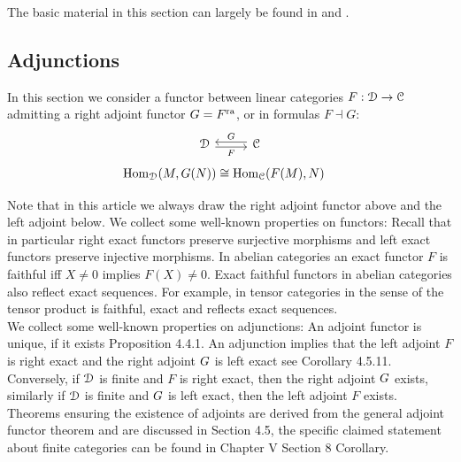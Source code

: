 \documentclass[a4paper, reqno]{amsart}
\theoremstyle{introTheorems}
\newcommand\Hom{\textup{Hom}}
\renewcommand{\1}{\mathbbold{1}}
\begin{document}
The basic material in this section can largely be found in \cite{Riehl16} and \cite{BV07}. 

\subsection{Adjunctions}

In this section we consider  a functor between linear categories $F:\mathcal{D} \to \mathcal{C}$ admitting a right adjoint functor ${G}=F^{\mathrm{ra}}$, or in formulas $F\dashv G$:
\[\begin{tikzcd}[row sep=5ex, column sep=6ex]
\catD\arrow[r,swap, shift right=2pt,"F"] & \arrow[l,swap, shift right=2pt,"\Fra"] \catC
\end{tikzcd}\]
\begin{align*}
\Hom_\catD(M,\Fra(N)) 
&\cong\Hom_\catC(F(M),N) 
\end{align*}

Note that in this article we always draw the right adjoint functor above and the left adjoint below. We collect some well-known properties on functors: 
Recall that in particular right exact functors preserve surjective morphisms and left exact functors preserve injective morphisms.
In abelian categories an exact functor $F$ is faithful iff $X\neq 0$ implies $F(X)\neq 0$. Exact faithful functors in abelian categories also reflect exact sequences. For example, in tensor categories in the sense of \cite{EGNO15} the tensor product is faithful, exact and reflects exact sequences. \\

We collect some well-known properties on adjunctions:
An adjoint functor is unique, if it exists \cite{Riehl16} Proposition 4.4.1.
An adjunction implies that the left adjoint $F$ is right exact and the right adjoint  ${G}$ is left exact see \cite{Riehl16} Corollary 4.5.11.
Conversely, if $\mathcal{D}$ is finite and $F$ is right exact, then the right adjoint ${G}$ exists, similarly if  $\mathcal{D}$ is finite and ${G}$ is left exact, then the left adjoint $F$ exists. Theorems ensuring the existence of adjoints are derived from the general adjoint functor theorem and are discussed in \cite{Riehl16} Section 4.5, the specific claimed statement about finite categories can be found in \cite{MacL52} Chapter V Section 8 Corollary. 
\end{document}
